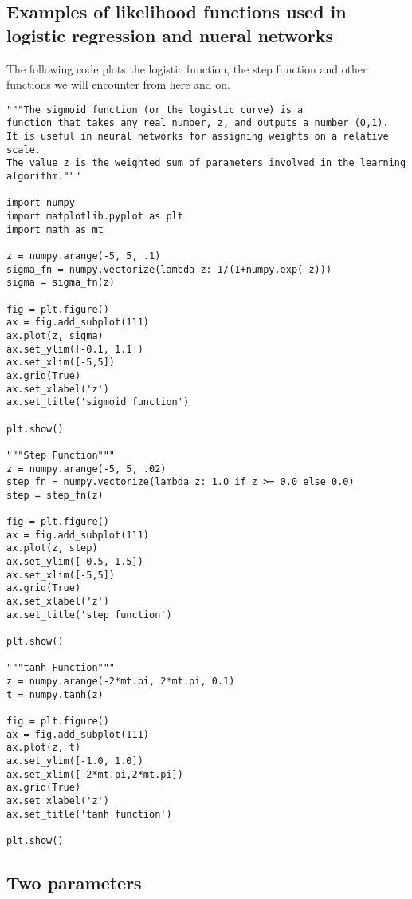 \documentclass[%
oneside,                 %
final,                   %
10pt]{article}
\begin{document}
\subsection*{Examples of likelihood functions used in logistic regression and nueral networks}


The following code plots the logistic function, the step function and other functions we will encounter from here and on.


\begin{verbatim}
"""The sigmoid function (or the logistic curve) is a
function that takes any real number, z, and outputs a number (0,1).
It is useful in neural networks for assigning weights on a relative scale.
The value z is the weighted sum of parameters involved in the learning algorithm."""

import numpy
import matplotlib.pyplot as plt
import math as mt

z = numpy.arange(-5, 5, .1)
sigma_fn = numpy.vectorize(lambda z: 1/(1+numpy.exp(-z)))
sigma = sigma_fn(z)

fig = plt.figure()
ax = fig.add_subplot(111)
ax.plot(z, sigma)
ax.set_ylim([-0.1, 1.1])
ax.set_xlim([-5,5])
ax.grid(True)
ax.set_xlabel('z')
ax.set_title('sigmoid function')

plt.show()

"""Step Function"""
z = numpy.arange(-5, 5, .02)
step_fn = numpy.vectorize(lambda z: 1.0 if z >= 0.0 else 0.0)
step = step_fn(z)

fig = plt.figure()
ax = fig.add_subplot(111)
ax.plot(z, step)
ax.set_ylim([-0.5, 1.5])
ax.set_xlim([-5,5])
ax.grid(True)
ax.set_xlabel('z')
ax.set_title('step function')

plt.show()

"""tanh Function"""
z = numpy.arange(-2*mt.pi, 2*mt.pi, 0.1)
t = numpy.tanh(z)

fig = plt.figure()
ax = fig.add_subplot(111)
ax.plot(z, t)
ax.set_ylim([-1.0, 1.0])
ax.set_xlim([-2*mt.pi,2*mt.pi])
ax.grid(True)
ax.set_xlabel('z')
ax.set_title('tanh function')

plt.show()
\end{verbatim}







\subsection*{Two parameters}
\end{document}
